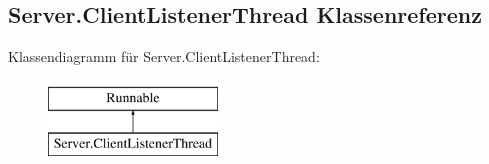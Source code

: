 \hypertarget{a00010}{\subsection{Server.\-Client\-Listener\-Thread Klassenreferenz}
\label{a00010}
}
Klassendiagramm für Server.\-Client\-Listener\-Thread\-:\begin{figure}[H]
\begin{center}
\leavevmode
\includegraphics[height=2.000000cm]{a00010}
\end{center}
\end{figure}
